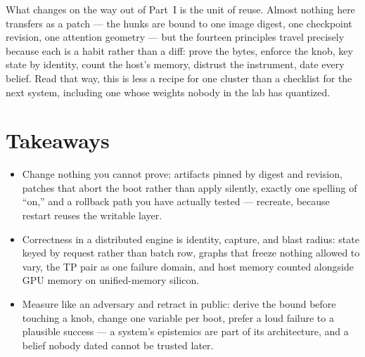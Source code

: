 What changes on the way out of Part~I is the unit of reuse. Almost nothing
here transfers as a patch --- the hunks are bound to one image digest, one
checkpoint revision, one attention geometry --- but the fourteen principles
travel precisely because each is a habit rather than a diff: prove the
bytes, enforce the knob, key state by identity, count the host's memory,
distrust the instrument, date every belief. Read that way, this is less a
recipe for one cluster than a checklist for the next system, including one
whose weights nobody in the lab has quantized.

\FloatBarrier
\section*{Takeaways}
\begin{itemize}
  \item Change nothing you cannot prove: artifacts pinned by digest and
    revision, patches that abort the boot rather than apply silently,
    exactly one spelling of ``on,'' and a rollback path you have actually
    tested --- recreate, because restart reuses the writable layer.
  \item Correctness in a distributed engine is identity, capture, and blast
    radius: state keyed by request rather than batch row, graphs that
    freeze nothing allowed to vary, the TP pair as one failure domain, and
    host memory counted alongside GPU memory on unified-memory silicon.
  \item Measure like an adversary and retract in public: derive the bound
    before touching a knob, change one variable per boot, prefer a loud
    failure to a plausible success --- a system's epistemics are part of
    its architecture, and a belief nobody dated cannot be trusted later.
\end{itemize}

